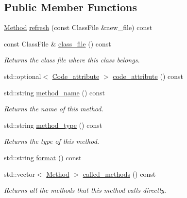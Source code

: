 \subsection*{Public Member Functions}
\begin{DoxyCompactItemize}
\item 
\hyperlink{classMethod}{Method} \hyperlink{classMethod_ac6a47d5797a62c5ffbb39df54ff7171d}{refresh} (const Class\+File \&new\+\_\+file) const
\item 
\mbox{\label{classMethod_ac6eecb9ebb1eb23098c8556752353a81}} 
const Class\+File \& \hyperlink{classMethod_ac6eecb9ebb1eb23098c8556752353a81}{class\+\_\+file} () const
\begin{DoxyCompactList}\small\item\em Returns the class file where this class belongs. \end{DoxyCompactList}\item 
std\+::optional$<$ \hyperlink{structCode__attribute}{Code\+\_\+attribute} $>$ \hyperlink{classMethod_af92b40aa1a81df3a6827d688adc005bf}{code\+\_\+attribute} () const
\item 
\mbox{\label{classMethod_ab0855cbda89f070acc27ebff025ffd15}} 
std\+::string \hyperlink{classMethod_ab0855cbda89f070acc27ebff025ffd15}{method\+\_\+name} () const
\begin{DoxyCompactList}\small\item\em Returns the name of this method. \end{DoxyCompactList}\item 
\mbox{\label{classMethod_a86015f24da420dc7502bdac6138a4a47}} 
std\+::string \hyperlink{classMethod_a86015f24da420dc7502bdac6138a4a47}{method\+\_\+type} () const
\begin{DoxyCompactList}\small\item\em Returns the type of this method. \end{DoxyCompactList}\item 
std\+::string \hyperlink{classMethod_a3f6d55a368a1e2727bea0799c3cdc0f6}{format} () const
\item 
\mbox{\label{classMethod_a378e12e19cf0c8f21bfc13071382d15e}} 
std\+::vector$<$ \hyperlink{classMethod}{Method} $>$ \hyperlink{classMethod_a378e12e19cf0c8f21bfc13071382d15e}{called\+\_\+methods} () const
\begin{DoxyCompactList}\small\item\em Returns all the methods that {\itshape this} method calls directly. \end{DoxyCompactList}\item 

\end{DoxyCompactItemize}
